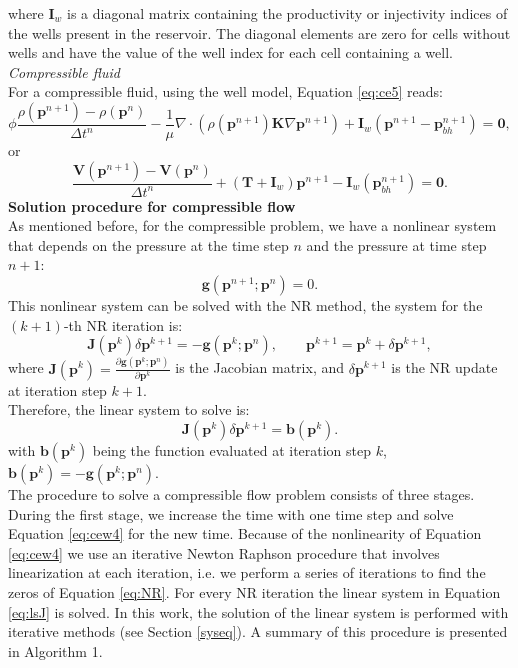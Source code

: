 \documentclass[12pt]{article}
\begin{document}
where $\mathbf{I}_w$ is a diagonal matrix containing the productivity or injectivity indices of the wells present in the reservoir. 
The diagonal elements are zero for cells without wells and have the value of the well index for each cell containing a well.\\
\emph{Compressible fluid}\\
For a compressible fluid, using the well model, Equation \eqref{eq:ce5} reads:
\begin{equation}\label{eq:cew4}
 {\phi}\frac{{\rho}(\mathbf{p}^{n+1})
 -{\rho}(\mathbf{p}^{n})}{\Delta t^n}
 -\frac{1}{\mu}\nabla \cdot ({\rho}(\mathbf{p}^{n+1}) 
 \mathbf{K}\nabla\mathbf{p}^{n+1})+\mathbf{I}_w(\mathbf{p}^{n+1}-\mathbf{p}_{bh}^{n+1})=\mathbf{0},
\end{equation}
or
\begin{equation*}
\frac{\mathbf{V}(\mathbf{{p}}^{n+1})-\mathbf{V}(\mathbf{{p}}^{n})}{\Delta t^n}+(\mathbf{T}+\mathbf{I}_w)\mathbf{p}^{n+1}-\mathbf{I}_w(\mathbf{p}_{bh}^{n+1})=\mathbf{0}.
\end{equation*}
\textbf{Solution procedure for compressible flow}\\
As mentioned before, for the compressible problem, we have a nonlinear system that depends on the pressure at the time step $n$ and the pressure at time step $n+1$:
\begin{equation}\label{eq:NR}
 \mathbf{g}(\mathbf{p}^{n+1};\mathbf{p}^n)=0.
\end{equation}
This nonlinear system can be solved with the NR method, the system for the $(k+1)$-th NR iteration is:
$$\mathbf{J}(\mathbf{p}^k)\delta\mathbf{p}^{k+1}=-\mathbf{g}(\mathbf{p}^k;\mathbf{p}^n),
\qquad \mathbf{p}^{k+1}=\mathbf{p}^k+\delta \mathbf{p}^{k+1},$$
where $\mathbf{J}(\mathbf{p}^k)=\frac{\partial \mathbf{g}(\mathbf{p}^k;\mathbf{p}^n)}{\partial \mathbf{p}^k}$ is the 
Jacobian matrix, and $\delta \mathbf{p}^{k+1}$ is the NR update at iteration step $k+1$.\\
Therefore, the linear system to solve is:\\
\begin{equation}\label{eq:lsJ}
\mathbf{J}(\mathbf{p}^k)\delta \mathbf{p}^{k+1}=\mathbf{b}(\mathbf{p}^k).
\end{equation}
with $\mathbf{b}(\mathbf{p}^k)$ being the function evaluated at iteration step $k$, $\mathbf{b}(\mathbf{p}^k)=-\mathbf{g}(\mathbf{p}^k;\mathbf{p}^n)$.\\
The procedure to solve a compressible flow problem consists of three stages. During the first stage, we increase the time with one time step and solve Equation \eqref{eq:cew4} for the new time. Because of the nonlinearity of Equation \eqref{eq:cew4} we use an iterative Newton Raphson procedure that involves linearization at each iteration, i.e. we perform a series of iterations to find the 
zeros of Equation \eqref{eq:NR}. For every NR iteration the linear system in Equation \eqref{eq:lsJ} is solved. 
In this work, the solution of the linear system is performed with iterative methods (see Section \ref{syseq}). A summary of 
this procedure is presented in Algorithm 1.
\end{document}
